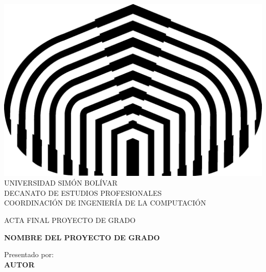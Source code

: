 \begin{titlepage}
    \begin{center}
        
        \includegraphics[scale=0.5]{figures/logo} \\
        
        \textsc {\large UNIVERSIDAD SIM\'ON BOL\'IVAR} \\
        \textsc{DECANATO DE ESTUDIOS PROFESIONALES\\
            COORDINACI\'ON DE INGENIER\'IA DE LA COMPUTACI\'ON}
        
        \bigskip
        \bigskip
        \bigskip
        \bigskip
        \bigskip
        \bigskip
        
        \textsc{ACTA FINAL PROYECTO DE GRADO}
        
        \bigskip
        \bigskip
        
        \textsc{\bfseries NOMBRE DEL PROYECTO DE GRADO}
        
        \bigskip
        \bigskip
        \bigskip
        \bigskip
        
        \begin{minipage}{\textwidth}
            \centering
            Presentado por: \\
            \textsc{\bfseries AUTOR} \\
            
            \bigskip
            \bigskip
            \bigskip
            \bigskip
            

\end{minipage}
\end{center}
\end{titlepage}
